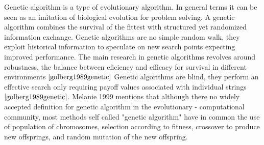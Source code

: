 Genetic algorithm is a type of evolutionary algorithm. In general terms it can be seen as an imitation of biological evolution for problem solving. A genetic algorithm combines the survival of the fittest with  structured yet randomized information exchange. Genetic algorithms are no simple random walk, they exploit historical information to speculate on new search points expecting improved performance. The main research in genetic algorithms revolves around robustness, the balance between eficiency and efficacy for survival in different environments $\cite{golberg1989genetic}$ Genetic algorithms are blind, they perform an effective search only requiring payoff values associated with individual strings $\cite{golberg1989genetic}$.  Melanie 1999 mentions that although there no widely accepted definition for genetic algorithm in the evolutionary - computational community, most methods self called "genetic algorithm" have in common the use of population of chromosomes, selection according to fitness, crossover to produce new offsprings, and random mutation of the new offspring.  

